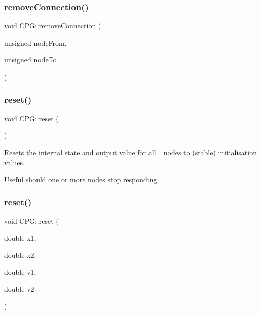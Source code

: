 \mbox{\label{classCPG_ab2c84c91fc9de378a6ed0a29305244cc}} 
\subsubsection{\texorpdfstring{remove\+Connection()}{removeConnection()}}
{\footnotesize\ttfamily void C\+P\+G\+::remove\+Connection (\begin{DoxyParamCaption}\item[{unsigned}]{node\+From,  }\item[{unsigned}]{node\+To }\end{DoxyParamCaption})}

\mbox{\label{classCPG_ae8f7953090be35f7da520c19ad6825b9}} 
\subsubsection{\texorpdfstring{reset()}{reset()}\hspace{0.1cm}{\footnotesize\ttfamily [1/4]}}
{\footnotesize\ttfamily void C\+P\+G\+::reset (\begin{DoxyParamCaption}{ }\end{DoxyParamCaption})}



Resets the internal state and output value for all \+\_\+nodes to (stable) initialisation values. 

Useful should one or more nodes stop responding. \mbox{\label{classCPG_a0fcb4e728f2f647cf2af8e4a01223212}} 
\subsubsection{\texorpdfstring{reset()}{reset()}\hspace{0.1cm}{\footnotesize\ttfamily [2/4]}}
{\footnotesize\ttfamily void C\+P\+G\+::reset (\begin{DoxyParamCaption}\item[{double}]{x1,  }\item[{double}]{x2,  }\item[{double}]{v1,  }\item[{double}]{v2 }\end{DoxyParamCaption})}



